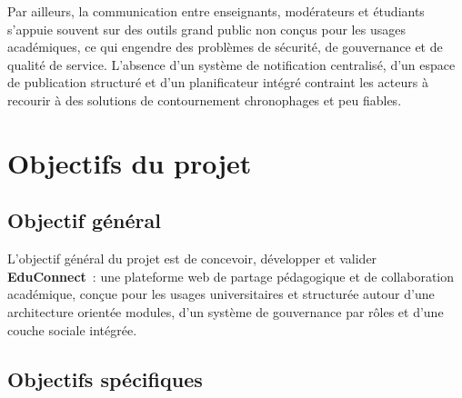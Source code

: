 Par ailleurs, la communication entre enseignants, mod\'erateurs et \'etudiants s'appuie souvent sur des outils grand public non con\c{c}us pour les usages acad\'emiques, ce qui engendre des probl\`emes de s\'ecurit\'e, de gouvernance et de qualit\'e de service. L'absence d'un syst\`eme de notification centralis\'e, d'un espace de publication structur\'e et d'un planificateur int\'egr\'e contraint les acteurs \`a recourir \`a des solutions de contournement chronophages et peu fiables.

\medskip
\noindent{}
\medskip

\section{Objectifs du projet}
\label{sec:objectifs}

\subsection{Objectif g\'en\'eral}

L'objectif g\'en\'eral du projet est de concevoir, d\'evelopper et valider \textbf{EduConnect}~: une plateforme web de partage p\'edagogique et de collaboration acad\'emique, con\c{c}ue pour les usages universitaires et structur\'ee autour d'une architecture orient\'ee modules, d'un syst\`eme de gouvernance par r\^oles et d'une couche sociale int\'egr\'ee.

\subsection{Objectifs sp\'ecifiques}

